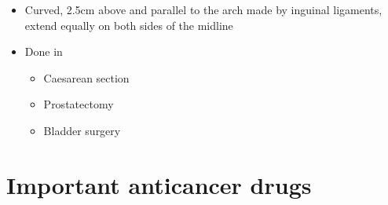 \documentclass[
  12pt,
]{memoir}
\providecommand{\tightlist}{%
  \setlength{\itemsep}{0pt}\setlength{\parskip}{0pt}}
\begin{document}
\begin{itemize}
\tightlist
\item
  Curved, 2.5cm above and parallel to the arch made by inguinal
  ligaments, extend equally on both sides of the midline
\item
  Done in

  \begin{itemize}
  \tightlist
  \item
    Caesarean section
  \item
    Prostatectomy
  \item
    Bladder surgery
  \end{itemize}
\end{itemize}

\hypertarget{important-anticancer-drugs}{%
\section{Important anticancer drugs}\label{important-anticancer-drugs}}
\end{document}
